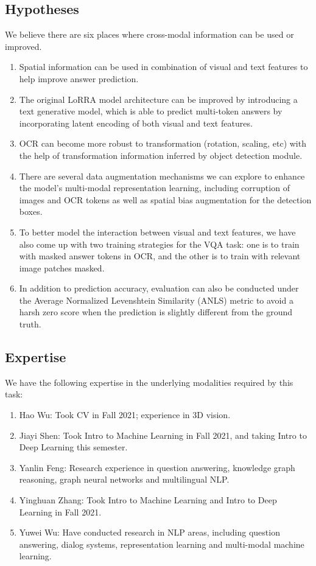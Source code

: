 \documentclass[11pt,a4paper]{article}
\begin{document}
\subsection{Hypotheses}
We believe there are six places where cross-modal information can be used or improved.
  \begin{enumerate}
    \item Spatial information can be used in combination of visual and text features to help improve answer prediction.
    
    \item The original LoRRA model architecture can be improved by introducing a text generative model, which is able to predict multi-token answers by incorporating latent encoding of both visual and text features.
    
    \item OCR can become more robust to transformation (rotation, scaling, etc) with the help of transformation information inferred by object detection module. 
    \item There are several data augmentation mechanisms we can explore to enhance the model's multi-modal representation learning, including corruption of images and OCR tokens as well as spatial bias augmentation for the detection boxes.
    \item To better model the interaction between visual and text features, we have also come up with two training strategies for the VQA task: one is to train with masked answer tokens in OCR, and the other is to train with relevant image patches masked. 
    \item In addition to prediction accuracy, evaluation can also be conducted under the Average Normalized Levenshtein Similarity (ANLS) metric to avoid a harsh zero score when the prediction is slightly different from the ground truth. 
    
  \end{enumerate}
\subsection{Expertise}
We have the following expertise in the underlying modalities required by this task:
  \begin{enumerate}
      \item Hao Wu: Took CV in Fall 2021; experience in 3D vision.
      \item Jiayi Shen: Took Intro to Machine Learning in Fall 2021, and taking Intro to Deep Learning this semester.
      \item Yanlin Feng: Research experience in question answering, knowledge graph reasoning, graph neural networks and multilingual NLP.
      \item Yinghuan Zhang: Took Intro to Machine Learning and Intro to Deep Learning in Fall 2021.
      \item Yuwei Wu: Have conducted research in NLP areas, including question answering, dialog systems, representation learning and multi-modal machine learning.
  \end{enumerate}
\end{document}
